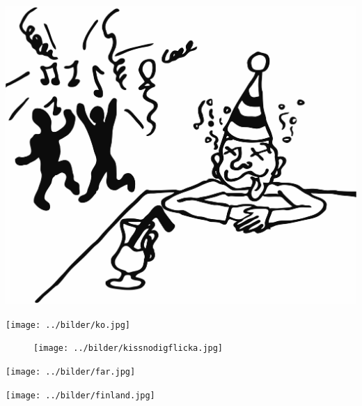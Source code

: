 \begin{intersong}
\sffamily\bfseries\LARGE{}
\begin{center}
\includegraphics[scale=.8]{../bilder/fardigabilder/BilderTillKapitel/jagvarfull.png} 
\end{center}
\end{intersong}
\sclearpage

\begin{intersong}
\begin{center}
\texttt{[image: ../bilder/ko.jpg]} 
\end{center}
\end{intersong}
\sclearpage


\sclearpage

%
\clearpage

\begin{figure}
\begin{center}
\texttt{[image: ../bilder/kissnodigflicka.jpg]} 
\end{center}
\end{figure}
\clearpage

\begin{intersong}
\begin{center}
\texttt{[image: ../bilder/far.jpg]} 
\end{center}
\end{intersong}
\sclearpage


\clearpage

\sclearpage

\begin{intersong}
\begin{center}
\texttt{[image: ../bilder/finland.jpg]} 
\end{center}
\end{intersong}
